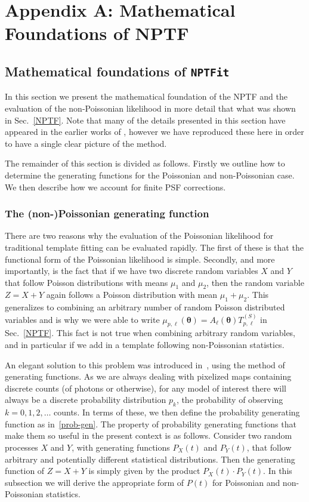 \chapter{Appendix A: Mathematical Foundations of NPTF}

\section{Mathematical foundations of \texttt{NPTFit}}
\label{details}

In this section we present the mathematical foundation of the NPTF and the evaluation of the non-Poissonian likelihood in more detail that what was shown in Sec.~\ref{NPTF}. Note that many of the details presented in this section have appeared in the earlier works of \cite{Malyshev:2011zi,Lee:2014mza,Lee:2015fea}, however we have reproduced these here in order to have a single clear picture of the method.

The remainder of this section is divided as follows. Firstly we outline how to determine the generating functions for the Poissonian and non-Poissonian case. We then describe how we account for finite PSF corrections.

\subsection{The (non-)Poissonian generating function}

There are two reasons why the evaluation of the Poissonian likelihood for traditional template fitting can be evaluated rapidly. The first of these is that the functional form of the Poissonian likelihood is simple. Secondly, and more importantly, is the fact that if we have two discrete random variables $X$ and $Y$ that follow Poisson distributions with means $\mu_1$ and $\mu_2$, then the random variable $Z = X + Y$ again follows a Poisson distribution with mean $\mu_1 + \mu_2$. This generalizes to combining an arbitrary number of random Poisson distributed variables and is why we were able to write $\mu_{p,\ell}(\bm{\theta}) = A_{\ell}(\bm{\theta})T_{p,\ell}^{(S)}$ in Sec.~\ref{NPTF}. This fact is not true when combining arbitrary random variables, and in particular if we add in a template following non-Poissonian statistics. 

An elegant solution to this problem was introduced in~\cite{Malyshev:2011zi}, using the method of generating functions. As we are always dealing with pixelized maps containing discrete counts (of photons or otherwise), for any model of interest there will always be a discrete probability distribution $p_k$, the probability of observing $k=0, 1, 2, \ldots$ counts. In terms of these, we then define the probability generating function as in~\eqref{prob-gen}. The property of probability generating functions that make them so useful in the present context is as follows. Consider two random processes $X$ and $Y$, with generating functions $P_X(t)$ and $P_Y(t)$, that follow arbitrary and potentially different statistical distributions. Then the generating function of $Z = X + Y$ is simply given by the product $P_X(t) \cdot P_Y(t)$. In this subsection we will derive the appropriate form of $P(t)$ for Poissonian and non-Poissonian statistics.

